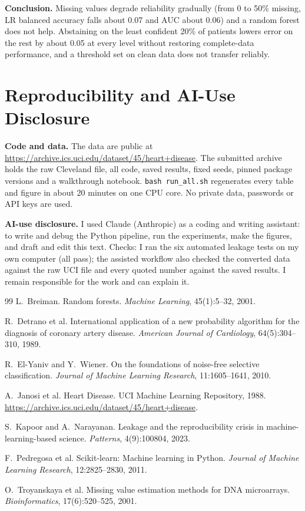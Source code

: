 \documentclass{article}
\begin{document}
\textbf{Conclusion.} Missing values degrade reliability gradually (from 0 to 50\% missing, LR balanced accuracy falls about 0.07 and AUC about 0.06) and a random forest does not help. Abstaining on the least confident 20\% of patients lowers error on the rest by about 0.05 at every level without restoring complete-data performance, and a threshold set on clean data does not transfer reliably.

\section{Reproducibility and AI-Use Disclosure}
\textbf{Code and data.} The data are public at \url{https://archive.ics.uci.edu/dataset/45/heart+disease}. The submitted archive holds the raw Cleveland file, all code, saved results, fixed seeds, pinned package versions and a walkthrough notebook. \texttt{bash run\_all.sh} regenerates every table and figure in about 20 minutes on one CPU core. No private data, passwords or API keys are used.

\textbf{AI-use disclosure.} I used Claude (Anthropic) as a coding and writing assistant: to write and debug the Python pipeline, run the experiments, make the figures, and draft and edit this text. Checks: I ran the six automated leakage tests on my own computer (all pass); the assisted workflow also checked the converted data against the raw UCI file and every quoted number against the saved results. I remain responsible for the work and can explain it.

\setlength{\bibsep}{0pt}
\begin{thebibliography}{99}\small
{}
L.~Breiman. Random forests. \emph{Machine Learning}, 45(1):5--32, 2001.

R.~Detrano et al. International application of a new probability algorithm for the diagnosis of coronary artery disease. \emph{American Journal of Cardiology}, 64(5):304--310, 1989.

R.~El-Yaniv and Y.~Wiener. On the foundations of noise-free selective classification. \emph{Journal of Machine Learning Research}, 11:1605--1641, 2010.

A.~Janosi et al. Heart Disease. UCI Machine Learning Repository, 1988. \url{https://archive.ics.uci.edu/dataset/45/heart+disease}.

S.~Kapoor and A.~Narayanan. Leakage and the reproducibility crisis in machine-learning-based science. \emph{Patterns}, 4(9):100804, 2023.

F.~Pedregosa et al. Scikit-learn: Machine learning in Python. \emph{Journal of Machine Learning Research}, 12:2825--2830, 2011.

O.~Troyanskaya et al. Missing value estimation methods for DNA microarrays. \emph{Bioinformatics}, 17(6):520--525, 2001.
\end{thebibliography}
\end{document}
